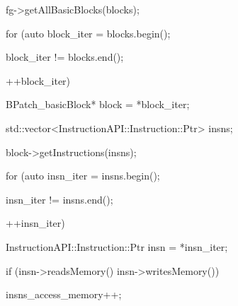{{{

fg->getAllBasicBlocks(blocks);}





\bigskip



{

for (auto block_iter = blocks.begin();



{

block_iter != blocks.end();



{

++block_iter) {}



{

BPatch_basicBlock* block = *block_iter;}



{

std::vector<InstructionAPI::Instruction::Ptr> insns;}



{

block->getInstructions(insns);}





\bigskip



{

for (auto insn_iter = insns.begin();



{

insn_iter != insns.end();



{

++insn_iter) {}



{

InstructionAPI::Instruction::Ptr insn = *insn_iter;}



{

if (insn->readsMemory() {\textbar}{\textbar} insn->writesMemory()) {}



{

insns_access_memory++;}



{

}}



{

}}



}}}}}}}
